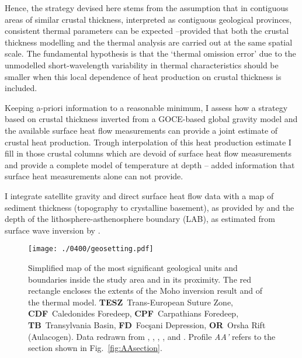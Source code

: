 Hence, the strategy devised here stems from the assumption that in contiguous areas of similar crustal thickness, interpreted as contiguous geological provinces, consistent thermal parameters can be expected --provided that both the crustal thickness modelling and the thermal analysis are carried out at the same spatial scale.
The fundamental hypothesis is that the `thermal omission error' due to the unmodelled short-wavelength variability in thermal characteristics should be smaller when this local dependence of heat production on crustal thickness is included.

Keeping a-priori information to a reasonable minimum, I assess how a strategy based on crustal thickness inverted from a GOCE-based global gravity model and the available surface heat flow measurements can provide a joint estimate of crustal heat production.
Trough interpolation of this heat production estimate I fill in those crustal columns which are devoid of surface heat flow measurements and provide a complete model of temperature at depth -- added information that surface heat measurements alone can not provide. 

I integrate satellite gravity and direct surface heat flow data with a map of sediment thickness (topography to crystalline basement), as provided by \textcite{Tesauro2008} and the depth of the lithosphere-asthenosphere boundary (LAB), as estimated from surface wave inversion by \textcite{Pasyanos2014}.

\begin{figure}
    \begin{adjustbox}{center}
        \texttt{[image: ./0400/geosetting.pdf]}
    \end{adjustbox}
	\caption[Simplified map of the most significant geological units and boundaries inside the study area and in its proximity.]{Simplified map of the most significant geological units and boundaries inside the study area and in its proximity. The red rectangle encloses the extents of the Moho inversion result and of the thermal model. \textbf{TESZ}~Trans-European Suture Zone, \textbf{CDF}~Caledonides Foredeep, \textbf{CPF}~Carpathians Foredeep, \textbf{TB}~Transylvania Basin, \textbf{FD}~Focşani Depression, \textbf{OR}~Orsha Rift (Aulacogen). Data redrawn from \textcite{Tarapoanca2003}, \textcite{Tesauro2008}, \textcite{Artemieva2013}, \textcite{Mazur2016}, and \textcite{Starostenko2018}. Profile \textit{AA'} refers to the section shown in Fig.~\ref{fig:AAsection}.}
    \label{fig:geosetting}
\end{figure}

